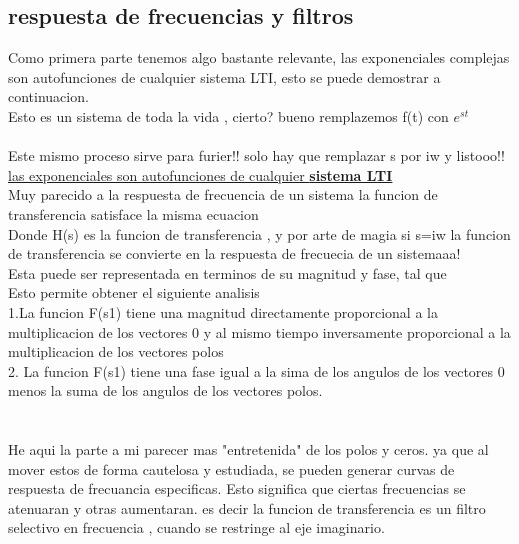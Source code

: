 \subsection { respuesta de frecuencias y filtros}
Como primera parte tenemos algo bastante relevante, las exponenciales complejas son autofunciones de cualquier sistema LTI, esto se puede demostrar a continuacion.
\\
Esto es un sistema de toda la vida , cierto? bueno remplazemos f(t) con $e^{st}$\\
\\ Este mismo proceso sirve para furier!! solo hay que remplazar s por iw y listooo!!\\ \underline{las exponenciales son autofunciones de cualquier \textbf{sistema LTI}}\\
Muy parecido a la respuesta de frecuencia de un sistema la funcion de transferencia satisface la misma ecuacion
\\
Donde H(s) es la funcion de transferencia , y por arte de magia si s=iw la funcion de transferencia se convierte en la respuesta de frecuecia de un sistemaaa!\\
Esta puede ser representada en terminos de su magnitud y fase, tal que
\\
Esto permite obtener el siguiente analisis\\
1.La funcion F(s1) tiene una magnitud directamente proporcional a la multiplicacion de los vectores 0 y al mismo tiempo inversamente proporcional a la multiplicacion de los vectores polos\\
2. La funcion F(s1) tiene una fase igual a la sima de los angulos de los vectores 0 menos la suma de los angulos de los vectores polos.\\\\\\
He aqui la parte a mi parecer mas "entretenida" de los polos y ceros. ya que al mover estos de forma cautelosa y estudiada, se pueden generar curvas de respuesta de frecuancia especificas. Esto significa que ciertas frecuencias se atenuaran y otras aumentaran. es decir la funcion de transferencia es un filtro selectivo en frecuencia , cuando se restringe al eje imaginario.\\
